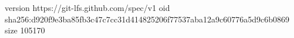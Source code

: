 version https://git-lfs.github.com/spec/v1
oid sha256:d920f9e3ba85fb3c47c7cc31d414825206f77537aba12a9c60776a5d9c6b0869
size 105170
